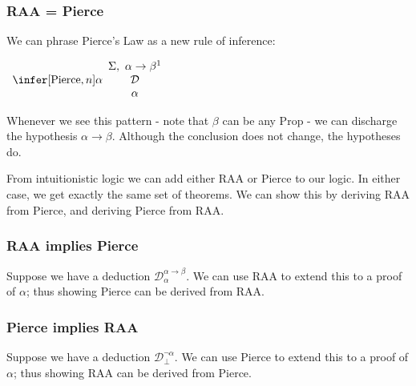 \documentclass{beamer}
\begin{document}
\begin{frame}
	\frametitle{RAA = Pierce}
	
	We can phrase Pierce's Law as a new rule of inference: 
	
	\begin{center}		
		$\begin{array}{c}		
		\infer[\text{Pierce},n]{\alpha}
		{\begin{array}{c} \Sigma, \ \alpha \to \beta^{1} \\ \mathcal{D} \\ \alpha \end{array}}
		\end{array}$
	\end{center}
	
	Whenever we see this pattern - note that $\beta$ can be any Prop - we can discharge the hypothesis $\alpha \to \beta$. Although the conclusion does not change, the hypotheses do.
	
	\vspace{5mm}
	
	From intuitionistic logic we can add either RAA or Pierce to our logic. In either case, we get exactly the same set of theorems. We can show this by deriving RAA from Pierce, and deriving Pierce from RAA. 

\end{frame}

\begin{frame}
	\frametitle{RAA implies Pierce}

	Suppose we have a deduction $\mathcal{D}^{\alpha \to \beta}_{\alpha}$. We can use RAA to extend this to a proof of $\alpha$; thus showing Pierce can be derived from RAA.
	
	\vspace{70mm}

\end{frame}

\begin{frame}
	\frametitle{Pierce implies RAA}

	Suppose we have a deduction $\mathcal{D}^{\lnot \alpha}_{\bot}$. We can use Pierce to extend this to a proof of $\alpha$; thus showing RAA can be derived from Pierce.
	
	\vspace{70mm}

\end{frame}
\end{document}
